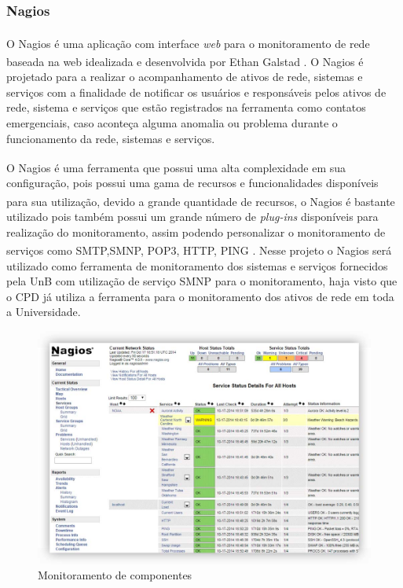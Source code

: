 \subsubsection{Nagios\textsuperscript{\textregistered}}

O Nagios\textsuperscript{\textregistered} é uma aplicação com interface \textit{web} para o monitoramento de rede baseada na web idealizada e desenvolvida por Ethan Galstad \cite{bin2011new}. O Nagios\textsuperscript{\textregistered} é projetado para a realizar o acompanhamento de ativos de rede, sistemas e serviços com a finalidade de notificar os usuários e responsáveis pelos ativos de rede, sistema e serviços que estão registrados na ferramenta como contatos emergenciais, caso aconteça alguma anomalia ou problema durante o funcionamento da rede, sistemas e serviços.

O Nagios\textsuperscript{\textregistered} é uma ferramenta que possui uma alta complexidade em sua configuração, pois possui uma gama de recursos e funcionalidades disponíveis para sua utilização, devido a grande quantidade de recursos, o Nagios\textsuperscript{\textregistered} é bastante utilizado pois também possui um grande número de \textit{plug-ins} disponíveis para realização do monitoramento, assim podendo personalizar o monitoramento de serviços como SMTP,\acrshort{SMNP}, POP3, HTTP, PING \cite{lcc2012nagios}. Nesse projeto o Nagios\textsuperscript{\textregistered} será utilizado como ferramenta de monitoramento dos sistemas e serviços fornecidos pela \acrshort{UnB} com utilização de serviço \acrshort{SMNP} para o monitoramento, haja visto que o \acrshort{CPD} já utiliza a ferramenta para o monitoramento dos ativos de rede em toda a Universidade. 

\begin{figure}[H]
	\begin{center}
	\includegraphics[scale = 0.39]{img/Comprehensive_Monitoring_Drop2.jpg}
		\caption{Monitoramento de componentes\cite{lcc2012nagios}}
		\label{fun:fig:nagios}
	\end{center}
\end{figure}

